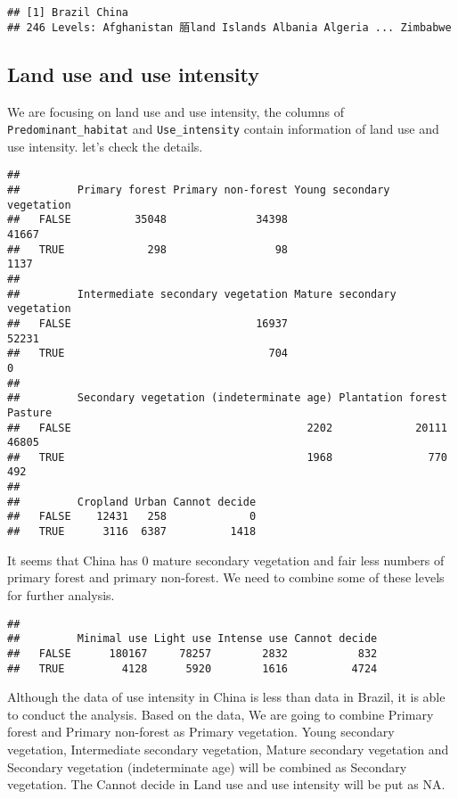 \documentclass[
]{article}
\begin{document}
\begin{verbatim}
## [1] Brazil China 
## 246 Levels: Afghanistan 脜land Islands Albania Algeria ... Zimbabwe
\end{verbatim}

\hypertarget{land-use-and-use-intensity}{%
\subsection{Land use and use
intensity}\label{land-use-and-use-intensity}}

We are focusing on land use and use intensity, the columns of
\texttt{Predominant\_habitat} and \texttt{Use\_intensity} contain
information of land use and use intensity. let's check the details.

\begin{verbatim}
##        
##         Primary forest Primary non-forest Young secondary vegetation
##   FALSE          35048              34398                      41667
##   TRUE             298                 98                       1137
##        
##         Intermediate secondary vegetation Mature secondary vegetation
##   FALSE                             16937                       52231
##   TRUE                                704                           0
##        
##         Secondary vegetation (indeterminate age) Plantation forest Pasture
##   FALSE                                     2202             20111   46805
##   TRUE                                      1968               770     492
##        
##         Cropland Urban Cannot decide
##   FALSE    12431   258             0
##   TRUE      3116  6387          1418
\end{verbatim}

It seems that China has 0 mature secondary vegetation and fair less
numbers of primary forest and primary non-forest. We need to combine
some of these levels for further analysis.

\begin{verbatim}
##        
##         Minimal use Light use Intense use Cannot decide
##   FALSE      180167     78257        2832           832
##   TRUE         4128      5920        1616          4724
\end{verbatim}

Although the data of use intensity in China is less than data in Brazil,
it is able to conduct the analysis. Based on the data, We are going to
combine Primary forest and Primary non-forest as Primary vegetation.
Young secondary vegetation, Intermediate secondary vegetation, Mature
secondary vegetation and Secondary vegetation (indeterminate age) will
be combined as Secondary vegetation. The Cannot decide in Land use and
use intensity will be put as NA.
\end{document}
